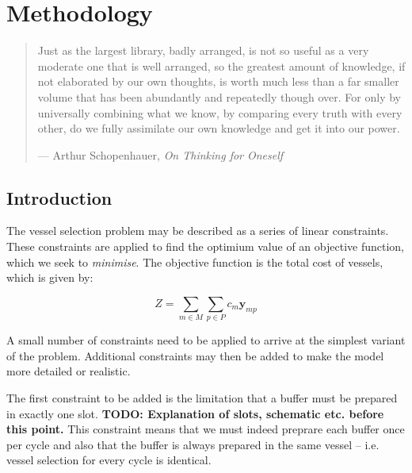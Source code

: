 %
%
%
%

\chapter{Methodology}\label{C.methodology}

\begin{quote}
Just as the largest library, badly arranged, is not so useful as a very moderate
one that is well arranged, so the greatest amount of knowledge, if not
elaborated by our own thoughts, is worth much less than a far smaller volume
that has been abundantly and repeatedly though over.  For only by universally
combining what we know, by comparing every truth with every other, do we fully
assimilate our own knowledge and get it into our power.

\hspace{2cm}--- Arthur Schopenhauer, \emph{On Thinking for Oneself}
\end{quote}

\section{Introduction}\label{S.intro4}

The vessel selection problem may be described as a series of linear constraints.
These constraints are applied to find the optimium value of an objective
function, which we seek to \emph{minimise}.
The objective function is the total cost of vessels, which is given by:

\begin{equation}
    Z = \sum_{m \in M} \sum_{p \in P} c_m \boldsymbol{y}_{mp}
\end{equation}

A small number of constraints need to be applied to arrive at the simplest 
variant of the problem.
Additional constraints may then be added to make the model more detailed or
realistic.

The first constraint to be added is the limitation that a buffer must be 
prepared in exactly one slot. 
\textbf{TODO: Explanation of slots, schematic etc. before this point.}
This constraint means that we must indeed preprare each buffer once per cycle
and also that the buffer is always prepared in the same vessel -- i.e. vessel
selection for every cycle is identical.


